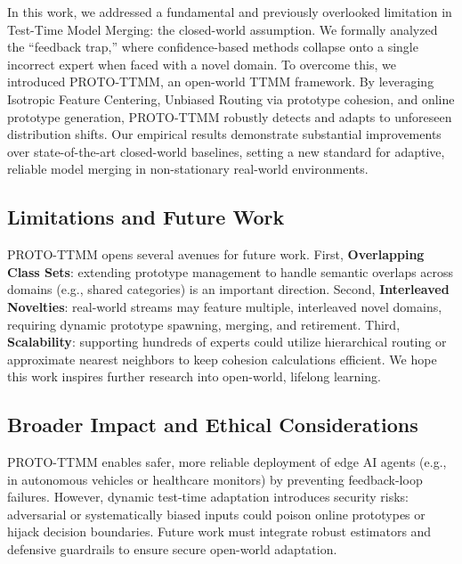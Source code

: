 \documentclass[twoside]{article}
\begin{document}
In this work, we addressed a fundamental and previously overlooked limitation in Test-Time Model Merging: the closed-world assumption. We formally analyzed the ``feedback trap,'' where confidence-based methods collapse onto a single incorrect expert when faced with a novel domain. To overcome this, we introduced PROTO-TTMM, an open-world TTMM framework. By leveraging Isotropic Feature Centering, Unbiased Routing via prototype cohesion, and online prototype generation, PROTO-TTMM robustly detects and adapts to unforeseen distribution shifts. Our empirical results demonstrate substantial improvements over state-of-the-art closed-world baselines, setting a new standard for adaptive, reliable model merging in non-stationary real-world environments.

\subsection{Limitations and Future Work}

PROTO-TTMM opens several avenues for future work. First, \textbf{Overlapping Class Sets}: extending prototype management to handle semantic overlaps across domains (e.g., shared categories) is an important direction. Second, \textbf{Interleaved Novelties}: real-world streams may feature multiple, interleaved novel domains, requiring dynamic prototype spawning, merging, and retirement. Third, \textbf{Scalability}: supporting hundreds of experts could utilize hierarchical routing or approximate nearest neighbors to keep cohesion calculations efficient. We hope this work inspires further research into open-world, lifelong learning.

\subsection{Broader Impact and Ethical Considerations}

PROTO-TTMM enables safer, more reliable deployment of edge AI agents (e.g., in autonomous vehicles or healthcare monitors) by preventing feedback-loop failures. However, dynamic test-time adaptation introduces security risks: adversarial or systematically biased inputs could poison online prototypes or hijack decision boundaries. Future work must integrate robust estimators and defensive guardrails to ensure secure open-world adaptation.

\end{document}
